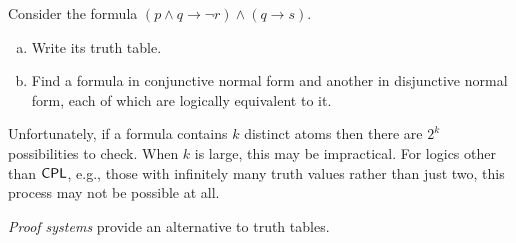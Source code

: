 \documentclass{article}
\begin{document}
\begin{prob}{3.1}
    Consider the formula $(p \wedge q \to \neg r) \wedge (q \to s)$.
    \begin{enumerate}[a)]
        \item Write its truth table.
        \item Find a formula in conjunctive normal form and another in disjunctive normal form, each of which are logically equivalent to it.
    \end{enumerate}
\end{prob}

Unfortunately, if a formula contains $k$ distinct atoms then there are $2^k$ possibilities to check. When $k$ is large, this may be impractical. For logics other than $\mathsf{CPL}$, e.g., those with infinitely many truth values rather than just two, this process may not be possible at all.

\emph{Proof systems} provide an alternative to truth tables.
\end{document}
